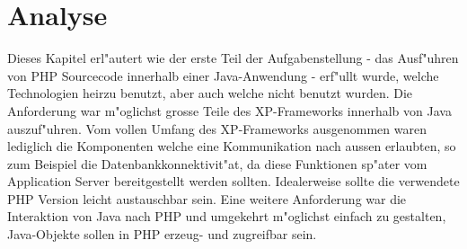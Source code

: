 \section{Analyse}
\label{sec:chap1:ana}
Dieses Kapitel erl"autert wie der erste Teil der Aufgabenstellung - das Ausf"uhren von PHP Sourcecode innerhalb
einer Java-Anwendung - erf"ullt wurde, welche Technologien heirzu benutzt, aber auch welche nicht benutzt wurden.
Die Anforderung war m"oglichst grosse Teile des XP-Frameworks innerhalb von Java auszuf"uhren.
Vom vollen Umfang des XP-Frameworks ausgenommen waren lediglich die Komponenten welche eine Kommunikation
nach aussen erlaubten, so zum Beispiel die Datenbankkonnektivit"at, da diese Funktionen sp"ater vom Application Server
bereitgestellt werden sollten. Idealerweise sollte die verwendete PHP Version leicht austauschbar sein. Eine weitere
Anforderung war die Interaktion von Java nach PHP und umgekehrt m"oglichst einfach zu gestalten, Java-Objekte sollen
in PHP erzeug- und zugreifbar sein.

